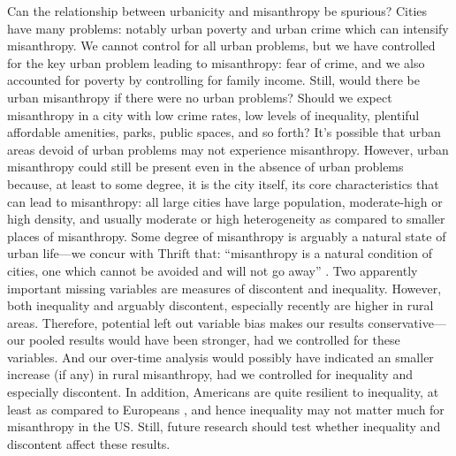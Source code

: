\documentclass[11pt, letterpaper]{article}
\begin{document}
\begin{spacing}{1.4}
Can the relationship between urbanicity and misanthropy be spurious? Cities have many problems: notably urban poverty and urban crime which can intensify misanthropy. We cannot control for all urban problems, but we have
controlled for the key urban problem leading to misanthropy: fear of crime, and we also accounted for poverty by controlling for family income. 
Still, would there be urban misanthropy if there were no urban problems? Should we expect misanthropy in a city with low crime rates, low levels of inequality, plentiful affordable amenities, parks, public spaces, and so forth? It's possible that urban areas devoid of urban problems may not experience misanthropy. However, urban misanthropy could still be present even in the absence of urban problems because, at least to some degree, it is the city itself, its core characteristics that can lead to misanthropy: all large cities have large population, moderate-high or high density, and usually moderate or high heterogeneity as compared to smaller
places of misanthropy. Some degree of misanthropy is arguably a natural state of urban life---we concur with Thrift that: ``misanthropy is a natural condition of cities, one which cannot be avoided and will not go away'' \citep{thrift05}.
%
Two apparently important missing variables are measures of discontent and
inequality. However, both inequality \citep[e.g.,][]{daleyMISCNYT20apr14} %
and arguably discontent, especially recently 
\citep[e.g.,][]{case15,hansonCityJournalautumn15,fullerNYT17monD} 
%
 are higher in rural areas. Therefore, potential left out variable bias makes
 our results conservative---our pooled results would have been stronger, had we controlled for these variables. 
 And our over-time analysis would possibly have indicated an smaller increase (if any) in rural misanthropy, had we controlled for inequality and especially discontent.  
 In addition, Americans are quite resilient to inequality, at least as compared to Europeans \citep{alesina04al}, and hence inequality may not matter much for misanthropy in the US.
Still, future research should test whether inequality and discontent affect these results. 


\end{spacing}
\end{document}

